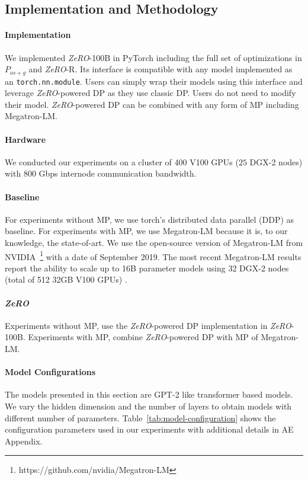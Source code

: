 \documentclass{article}
\newcommand{\name}{\emph{ZeRO}\xspace}
\begin{document}
\subsection{Implementation and Methodology}

\paragraph{Implementation}
We implemented \name-100B in PyTorch including the full set of optimizations in $P_{os+g}$ and \name-R.  Its interface is compatible with any model implemented as an {\tt torch.nn.module}. Users can simply wrap their models using this interface and leverage \name-powered DP as they use classic DP. Users do not need to modify their model.  \name-powered DP can be combined with any form of MP including Megatron-LM.

\paragraph{Hardware}
We conducted our experiments on a cluster of 400 V100 GPUs ($25$ DGX-2 nodes) with 800 Gbps internode communication bandwidth.

\paragraph{Baseline}
For experiments without MP, we use torch's distributed data parallel (DDP) as baseline. For experiments with MP, we use Megatron-LM because it is, to our knowledge, the state-of-art. We use the open-source version of Megatron-LM from NVIDIA~\footnote{https://github.com/nvidia/Megatron-LM} with a date of September 2019. The most recent Megatron-LM results report the ability to scale up to 16B parameter models using 32 DGX-2 nodes (total of 512 32GB V100 GPUs) \cite{megatronlm}. 

\paragraph{\name}
Experiments without MP, use the \name-powered DP implementation in \name-100B. 
Experiments with MP, combine \name-powered DP with MP of Megatron-LM.

\paragraph{Model Configurations}
The models presented in this section are GPT-2 \cite{gpt-2} like transformer based models. We vary the hidden dimension and the number of layers to obtain models with different number of parameters. Table~\ref{tab:model-configuration} shows the configuration parameters used in our experiments with additional details in AE Appendix.
\end{document}

